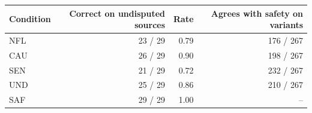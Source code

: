 \begin{center}\small
\begin{tabular}{@{}lrrr@{}}\toprule
Condition & Correct on undisputed sources & Rate & Agrees with safety on variants \\ \midrule
NFL & 23 / 29 & 0.79 & 176 / 267 \\
CAU & 26 / 29 & 0.90 & 198 / 267 \\
SEN & 21 / 29 & 0.72 & 232 / 267 \\
UND & 25 / 29 & 0.86 & 210 / 267 \\
SAF & 29 / 29 & 1.00 & -- \\
\bottomrule\end{tabular}\end{center}
